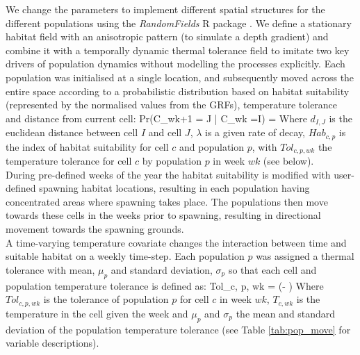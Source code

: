 \documentclass[preprint]{elsarticle}
\let\oldequation\equation
\let\oldendequation\endequation
\renewenvironment{equation}
 {\linenomathNonumbers\oldequation}
 {\oldendequation\endlinenomath}
\begin{document}
We change the parameters to implement different spatial structures for the
different populations using the \textit{RandomFields} R package
\citep{Schlater2015}. We define a stationary habitat field with an anisotropic
pattern (to simulate a depth gradient) and combine it with a temporally dynamic
thermal tolerance field to imitate two key drivers of population dynamics
without modelling the processes explicitly. Each population was initialised at
a single location, and subsequently moved across the entire space according to
a probabilistic distribution based on habitat suitability (represented by the
normalised values from the GRFs), temperature tolerance and distance from
current cell: 
\begin{equation}
	Pr(C_{wk+1} = J | C_{wk} =I) = 
\end{equation}
Where $d_{I,J}$ is the euclidean distance between cell $I$ and cell $J$,
$\lambda$ is a given rate of decay, $Hab_{c,p}$ is the index of habitat
suitability for cell $c$ and population $p$, with $Tol_{c,p,wk}$ the
temperature tolerance for cell $c$ by population $p$ in week $wk$ (see below).
\\

During pre-defined weeks of the year the habitat suitability is modified with
user-defined spawning habitat locations, resulting in each population having
concentrated areas where spawning takes place. The populations then move
towards these cells in the weeks prior to spawning, resulting in directional
movement towards the spawning grounds. \\

A time-varying temperature covariate changes the interaction between time and
suitable habitat on a weekly time-step. Each population $p$ was assigned a
thermal tolerance with mean, $\mu_{p}$ and standard deviation, $\sigma_{p}$ so
that each cell and population temperature tolerance is defined as:
\begin{equation}
	Tol_{c, p, wk} =   \exp \left(-
		 \right)	
\end{equation}
Where $Tol_{c, p, wk}$ is the tolerance of population $p$ for cell $c$ in week
$wk$, $T_{c, wk}$ is the temperature in the cell given the week and $\mu_{p}$
and $\sigma_{p}$ the mean and standard deviation of the population temperature
tolerance (see Table \ref{tab:pop_move} for variable descriptions). \\
\end{document}

